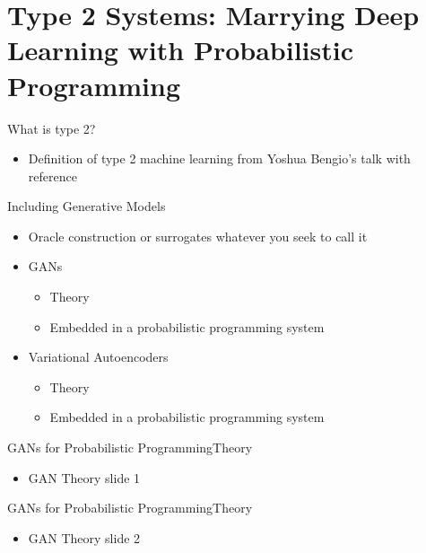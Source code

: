 \documentclass[AERbeamer%
              ,optEnglish%
              ,optBiber%
              ,optBibstyleAlphabetic%
              ,optBeamerClassicFormat%
              ]{AERlatex}%
\begin{document}
\section{Type 2 Systems: Marrying Deep Learning with Probabilistic Programming}

\begin{frame}[c]{What is type 2?}
    \centering
    \begin{itemize}
        \item Definition of type 2 machine learning from Yoshua Bengio's talk with reference
    \end{itemize}
\end{frame}


\begin{frame}[c]{Including Generative Models}
    \centering
    \begin{itemize}
        \item Oracle construction or surrogates whatever you seek to call it
        \item GANs
        \begin{itemize}
            \item Theory
            \item Embedded in a probabilistic programming system
        \end{itemize}
        \item Variational Autoencoders
        \begin{itemize}
            \item Theory
            \item Embedded in a probabilistic programming system
        \end{itemize}
    \end{itemize}
\end{frame}


\begin{frame}[c]{GANs for Probabilistic Programming}{Theory}
    \centering
    \begin{itemize}
        \item GAN Theory slide 1
    \end{itemize}
\end{frame}


\begin{frame}[c]{GANs for Probabilistic Programming}{Theory}
    \centering
    \begin{itemize}
        \item GAN Theory slide 2
    \end{itemize}
\end{frame}
\end{document}
